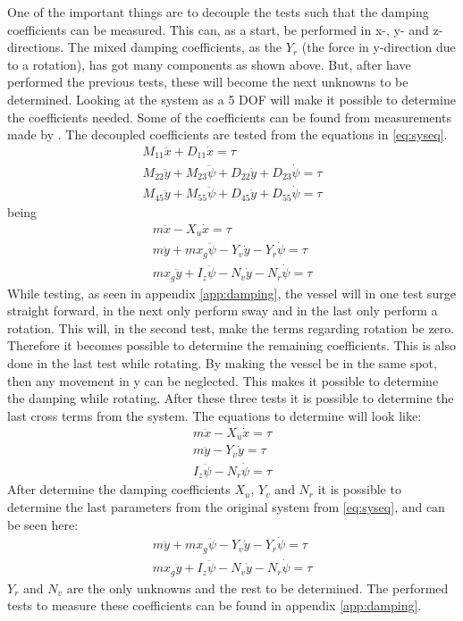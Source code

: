 One of the important things are to decouple the tests such that the damping coefficients can be measured. This can, as a start, be performed in x-, y- and z-directions. The mixed damping coefficients, as the $Y_r$ (the force in y-direction due to a rotation), has got many components as shown above. But, after have performed the previous tests, these will become the next unknowns to be determined. Looking at the system as a 5 \ac{DOF} will make it possible to determine the coefficients needed. Some of the coefficients can be found from measurements made by . The decoupled coefficients are tested from the equations in \ref{eq:syseq}.
\begin{subequations}
\begin{align}
M_{11} \ddot x + D_{11} \dot x = \tau\\
M_{22} \ddot y + M_{23} \ddot \psi + D_{22} \dot y + D_{23} \dot \psi = \tau\\
M_{45} \ddot y + M_{55} \ddot \psi + D_{45} \dot y + D_{55} \dot \psi = \tau
\end{align}
\end{subequations}
being
\begin{subequations}
\begin{align}
m \ddot x - X_u \dot x = \tau\\
m \ddot y + mx_g\ddot\psi - Y_v \dot y - Y_r \dot \psi = \tau\\
mx_g \ddot y + I_z\ddot \psi - N_v \dot y - N_r \dot \psi = \tau
\end{align}
\label{eq:syseq}
\end{subequations}
While testing, as seen in appendix \ref{app:damping}, the vessel will in one test surge straight forward, in the next only perform sway and in the last only perform a rotation. This will, in the second test, make the terms regarding rotation be zero. Therefore it becomes possible to determine the remaining coefficients. This is also done in the last test while rotating. By making the vessel be in the same spot, then any movement in y can be neglected. This makes it possible to determine the damping while rotating. After these three tests it is possible to determine the last cross terms from the system. The equations to determine will look like:
\begin{align}
m \ddot x - X_u \dot x = \tau\\
m \ddot y - Y_v \dot y = \tau\\
I_z\ddot \psi - N_r \dot \psi = \tau
\end{align}
After determine the damping coefficients $X_u$, $Y_v$ and $N_r$ it is possible to determine the last parameters from the original system from \ref{eq:syseq}, and can be seen here:
\begin{align}
m \ddot y + mx_g\ddot\psi - Y_v \dot y - Y_r \dot \psi = \tau\\
mx_g \ddot y + I_z\ddot \psi - N_v \dot y - N_r \dot \psi = \tau
\end{align}
$Y_r$ and $N_v$ are the only unknowns and the rest to be determined. The performed tests to measure these coefficients can be found in appendix \ref{app:damping}.
